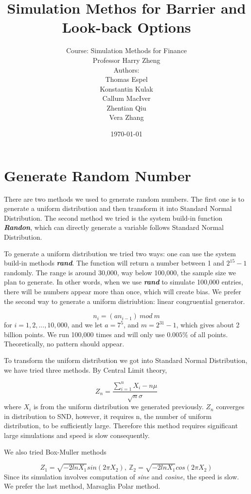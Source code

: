 \documentclass[12pt,a4paper,fleqn]{article}
\author{Course: Simulation Methods for Finance\\Professor Harry Zheng
\\[3cm] Authors:\\
Thomas Espel\\ Konstantin Kulak\\ Callum MacIver\\Zhentian Qiu\\Vera Zhang }
\title{Simulation Methos for Barrier and Look-back Options}
\date{\today}
\newcommand\Z{\mathbb Z}
\begin{document}
\maketitle

\newpage

\tableofcontents

\newpage

\section{Generate Random Number}

There are two methods we used to generate random numbers.
The first one is to generate a uniform distribution and then transform it into Standard Normal Distribution. The second method we tried is the system build-in function\textbf{\textit{ Randon}}, which can directly generate a variable follows Standard Normal Distribution.

To generate a uniform distribution we tried two ways: one can use the system build-in methods \textbf{\textit{rand}}. The function will return a number between 1 and $2^{15} -1$ randomly. The range is around 30,000, way below 100,000, the sample size we plan to generate. In other words, when we use \textbf{\textit{rand}} to simulate 100,000 entries, there will be numbers appear more than once, which will create bias. We prefer the second way to generate a uniform distriubtion: linear congruential generator.

$$n_i = (an_{i-1}) \ mod\ m$$for $i=1,2,...,10,000$, and we let $ a = 7^5$, and $m = 2^{31}-1$, which gives about 2 billion points. We run 100,000 times and will only use $0.005\%$ of all points. Theoretically, no pattern should appear.

To transform the uniform distribution we got into Standard Normal Distribution, we have tried three methods. By Central Limit theory,

$$ Z_n = \frac{\sum_{i=1}^{n}X_i-n\mu}{\sqrt{n}\sigma}$$where $X_i$ is from the uniform distribution we generated previously. $Z_n$ converges in distribution to SND, however, it requires n, the number of uniform distribution, to be sufficiently large. Therefore this method requires significant large simulations and speed is slow consequently.

We also tried Box-Muller methods

$$Z_1 = \sqrt{-2lnX_1}sin(2\pi X_2),\  \Z_2=\sqrt{-2lnX_1}cos(2\pi X_2)$$Since its simulation involves computation of \textit{sine} and \textit{cosine}, the speed is slow.
We prefer the last method, Marsaglia Polar method.
\end{document}
